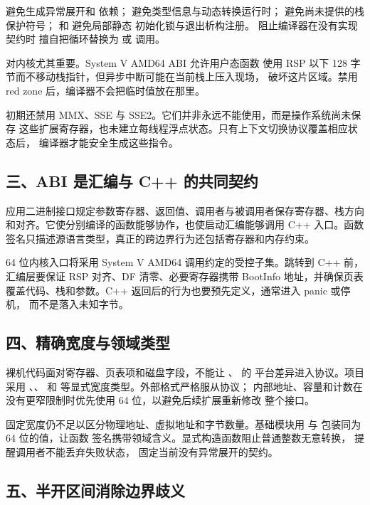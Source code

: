  避免生成异常展开和  依赖；
 避免类型信息与动态转换运行时；
 避免尚未提供的栈保护符号；
 和  避免局部静态
初始化锁与退出析构注册。 阻止编译器在没有实现契约时
擅自把循环替换为  或  调用。

 对内核尤其重要。System V AMD64 ABI 允许用户态函数
使用 RSP 以下 128 字节而不移动栈指针，但异步中断可能在当前栈上压入现场，
破坏这片区域。禁用 red zone 后，编译器不会把临时值放在那里。

初期还禁用 MMX、SSE 与 SSE2。它们并非永远不能使用，而是操作系统尚未保存
这些扩展寄存器，也未建立每线程浮点状态。只有上下文切换协议覆盖相应状态后，
编译器才能安全生成这些指令。

\subsection{三、ABI 是汇编与 C++ 的共同契约}

应用二进制接口规定参数寄存器、返回值、调用者与被调用者保存寄存器、栈方向
和对齐。它使分别编译的函数能够协作，也使启动汇编能够调用 C++ 入口。函数
签名只描述源语言类型，真正的跨边界行为还包括寄存器和内存约束。

64 位内核入口将采用 System V AMD64 调用约定的受控子集。跳转到 C++ 前，
汇编层要保证 RSP 对齐、DF 清零、必要寄存器携带 BootInfo 地址，并确保页表
覆盖代码、栈和参数。C++ 返回后的行为也要预先定义，通常进入 panic 或停机，
而不是落入未知字节。

\subsection{四、精确宽度与领域类型}

裸机代码面对寄存器、页表项和磁盘字段，不能让 、 的
平台差异进入协议。项目采用 、、
 和  等显式宽度类型。外部格式严格服从协议；
内部地址、容量和计数在没有更窄限制时优先使用 64 位，以避免后续扩展重新修改
整个接口。

固定宽度仍不足以区分物理地址、虚拟地址和字节数量。基础模块用
 与  包装同为 64 位的值，让函数
签名携带领域含义。显式构造函数阻止普通整数无意转换，\code{[[nodiscard]]}
提醒调用者不能丢弃失败状态， 固定当前没有异常展开的契约。

\subsection{五、半开区间消除边界歧义}

